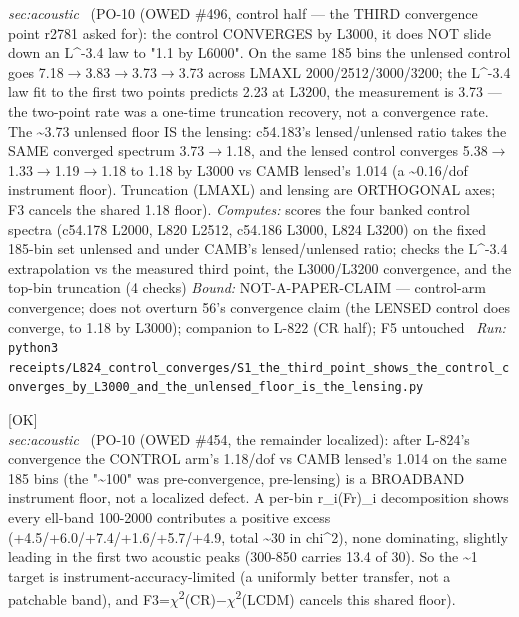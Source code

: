 \begin{description}
\textit{sec:acoustic} \ (PO-10 (OWED \#496, control half --- the THIRD convergence point r2781 asked for): the control CONVERGES by L3000, it does NOT slide down an L\textasciicircum{}-3.4 law to "1.1 by L6000". On the same 185 bins the unlensed control goes 7.18\ensuremath{\to}3.83\ensuremath{\to}3.73\ensuremath{\to}3.73 across LMAXL 2000/2512/3000/3200; the L\textasciicircum{}-3.4 law fit to the first two points predicts 2.23 at L3200, the measurement is 3.73 --- the two-point rate was a one-time truncation recovery, not a convergence rate. The \textasciitilde{}3.73 unlensed floor IS the lensing: c54.183's lensed/unlensed ratio takes the SAME converged spectrum 3.73\ensuremath{\to}1.18, and the lensed control converges 5.38\ensuremath{\to}1.33\ensuremath{\to}1.19\ensuremath{\to}1.18 to 1.18 by L3000 vs CAMB lensed's 1.014 (a \textasciitilde{}0.16/dof instrument floor). Truncation (LMAXL) and lensing are ORTHOGONAL axes; F3 cancels the shared 1.18 floor). 
\emph{Computes:} scores the four banked control spectra (c54.178 L2000, L820 L2512, c54.186 L3000, L824 L3200) on the fixed 185-bin set unlensed and under CAMB's lensed/unlensed ratio; checks the L\textasciicircum{}-3.4 extrapolation vs the measured third point, the L3000/L3200 convergence, and the top-bin truncation (4 checks)
 \emph{Bound:} NOT-A-PAPER-CLAIM --- control-arm convergence; does not overturn 56's convergence claim (the LENSED control does converge, to 1.18 by L3000); companion to L-822 (CR half); F5 untouched
\ \emph{Run:} \texttt{python3 receipts/L824\_control\_converges/S1\_the\_third\_point\_shows\_the\_control\_converges\_by\_L3000\_and\_the\_unlensed\_floor\_is\_the\_lensing.py}
\item[\label{rcpt:S1_the_converged_controls_remainder_is_a_broadband_instrument_floor_not_a_localized_defect}\texttt{S1\_the\_converged\_controls\_remainder\_is\_a\_broadband\_instrument\_floor\_not\_a\_localized\_defect}]\hfill\textsf{[OK]}\\
\textit{sec:acoustic} \ (PO-10 (OWED \#454, the remainder localized): after L-824's convergence the CONTROL arm's 1.18/dof vs CAMB lensed's 1.014 on the same 185 bins (the "\textasciitilde{}100" was pre-convergence, pre-lensing) is a BROADBAND instrument floor, not a localized defect. A per-bin r\_i(Fr)\_i decomposition shows every ell-band 100-2000 contributes a positive excess (+4.5/+6.0/+7.4/+1.6/+5.7/+4.9, total \textasciitilde{}30 in chi\textasciicircum{}2), none dominating, slightly leading in the first two acoustic peaks (300-850 carries 13.4 of 30). So the \textasciitilde{}1 target is instrument-accuracy-limited (a uniformly better transfer, not a patchable band), and F3=\ensuremath{\chi}\textsuperscript{2}(CR)\ensuremath{-}\ensuremath{\chi}\textsuperscript{2}(LCDM) cancels this shared floor). 

\end{description}
